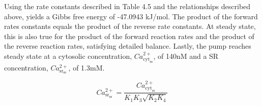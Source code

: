 \documentclass[12pt]{ucsddissertation}
\begin{document}
Using the rate constants described in Table 4.5 and the relationships described above, yields a Gibbs free energy of -47.0943 kJ/mol. The product of the forward rates constants equals the product of the reverse rate constants. At steady state, this is also true for the product of the forward reaction rates and the product of the reverse reaction rates, satisfying detailed balance. Lastly, the pump reaches steady state at a cytosolic concentration, $Ca^{2+}_{ \mathrm { cyt } _ { \mathrm { ss } } }$, of 140nM and a SR concentration, $Ca^{2+} _ { \mathrm { sr } _ { \mathrm { ss } } } $, of 1.3mM.

\begin{equation}
Ca^{2+} _ { \mathrm { sr } _ { \mathrm { ss } } } = \frac {Ca^{2+}_{ \mathrm { cyt } _ { \mathrm { ss } } } } { K _ { 1 } K _ { 3 } \sqrt { K _ { 2 } K _ { 4 } } }
\end{equation}

\setcounter{figure}{3}
\end{document}
